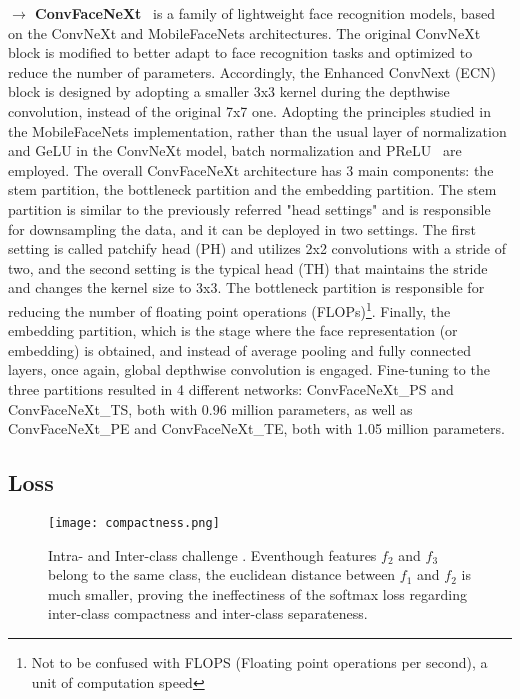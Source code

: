\documentclass[class=report, crop=false, a4paper, 12pt]{standalone}
\begin{document}
\vspace{0.7\baselineskip}
\noindent\textbf{$\rightarrow$ ConvFaceNeXt}~\autocite{hooConvFaceNeXtLightweightNetworks2022} is a family of lightweight face recognition models, based on the ConvNeXt and MobileFaceNets architectures. The original ConvNeXt block is modified to better adapt to face recognition tasks and optimized to reduce the number of parameters. Accordingly, the Enhanced ConvNext (ECN) block is designed by adopting a smaller 3x3 kernel during the depthwise convolution, instead of the original 7x7 one. Adopting the principles studied in the MobileFaceNets implementation, rather than the usual layer of normalization and GeLU in the ConvNeXt model, batch normalization and PReLU~\autocite{heDelvingDeepRectifiers2015} are employed. The overall ConvFaceNeXt architecture has 3 main components: the stem partition, the bottleneck partition and the embedding partition. The stem partition is similar to the previously referred "head settings" and is responsible for downsampling the data, and it can be deployed in two settings. The first setting is called patchify head (PH) and utilizes 2x2 convolutions with a stride of two, and the second setting is the typical head (TH) that maintains the stride and changes the kernel size to 3x3. The bottleneck partition is responsible for reducing the number of floating point operations (FLOPs)\footnote{Not to be confused with FLOPS (Floating point operations per second), a unit of computation speed}. Finally, the embedding partition, which is the stage where the face representation (or embedding) is obtained, and instead of average pooling and fully connected layers, once again, global depthwise convolution is engaged. Fine-tuning to the three partitions resulted in 4 different networks: ConvFaceNeXt\_PS and ConvFaceNeXt\_TS, both with 0.96 million parameters, as well as ConvFaceNeXt\_PE and ConvFaceNeXt\_TE, both with 1.05 million parameters.

\subsection{Loss}

\begin{figure}[!h]
    \centering
    \texttt{[image: compactness.png]}
    \caption{Intra- and Inter-class challenge \autocite{wangNormFaceL2Hypersphere2017}. Eventhough features $f_2$ and $f_3$ belong to the same class, the euclidean distance between $f_1$ and $f_2$ is much smaller, proving the ineffectiness of the softmax loss regarding inter-class compactness and inter-class separateness.}
    \label{fig:compactness}
\end{figure}
\end{document}
